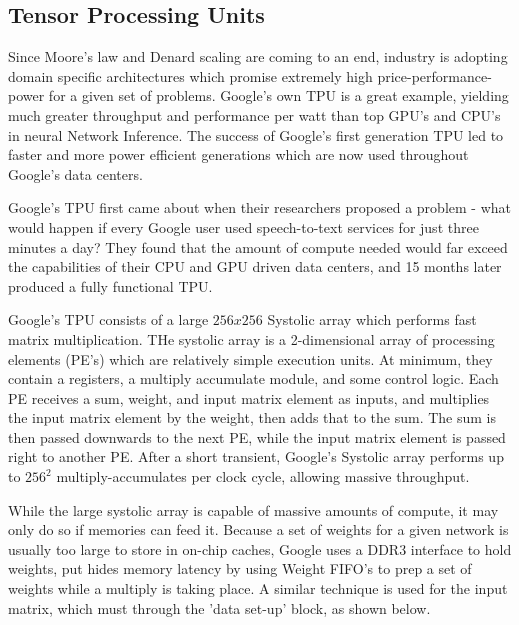 \documentclass[11pt, conference, onecolumn]{IEEEtran}
\begin{document}
\subsection{Tensor Processing Units}
    Since Moore's law and Denard scaling are coming to an end, industry is adopting
    domain specific architectures which promise extremely high price-performance-power for
    a given set of problems. Google's own TPU is a great example, yielding much greater
    throughput and performance per watt than top GPU's and CPU's in neural Network
    Inference. The success of Google's first generation TPU led to faster and more power
    efficient generations which are now used throughout Google's data centers.

    Google's TPU first came about when their researchers proposed a problem - what
    would happen if every Google user used speech-to-text services for just three minutes
    a day? They found that the amount of compute needed would far exceed the capabilities
    of their CPU and GPU driven data centers, and 15 months later produced a fully
    functional TPU.

    Google's TPU consists of a large $256 x 256$ Systolic array which performs fast matrix
    multiplication. THe systolic array is a 2-dimensional array of processing elements
    (PE's) which are relatively simple execution units. At minimum, they contain a
    registers, a multiply accumulate module, and some control logic. Each PE receives a
    sum, weight, and input matrix element as inputs, and multiplies the input matrix
    element by the weight, then adds that to the sum. The sum is then passed downwards
    to the next PE, while the input matrix element is passed right to another PE. After
    a short transient, Google's Systolic array performs up to $256^2$ multiply-accumulates
    per clock cycle, allowing massive throughput.

    While the large systolic array is capable of massive amounts of compute, it may only
    do so if memories can feed it. Because a set of weights for a given network is usually
    too large to store in on-chip caches, Google uses a DDR3 interface to hold weights,
    put hides memory latency by using Weight FIFO's to prep a set of weights while a
    multiply is taking place. A similar technique is used for the input matrix, which must
    through the 'data set-up' block, as shown below.
\end{document}
